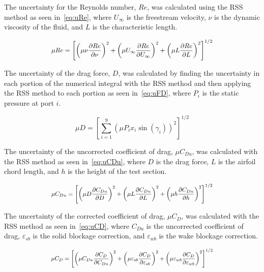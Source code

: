 \documentclass[journal,letterpaper]{IEEEtran}
\begin{document}
The uncertainty for the Reynolds number, $Re$, was calculated using the RSS method as seen in~\eqref{eq:uRe}, where $U_\infty$ is the freestream velocity, $\nu$ is the dynamic viscosity of the fluid, and $L$ is the characteristic length.

\begin{equation} \label{eq:uRe}
    \resizebox{227pt}{!}{$\displaystyle{\mu Re = \left[\left(\mu \nu \frac{\partial Re}{\partial \nu}\right)^2 + \left(\mu U_\infty \frac{\partial Re}{\partial U_\infty}\right)^2 + \left(\mu L \frac{\partial Re}{\partial L}\right)^2\right]^{1/2}}$}
\end{equation}

The uncertainty of the drag force, $D$, was calculated by finding the uncertainty in each portion of the numerical integral with the RSS method and then applying the RSS method to each portion as seen in~\eqref{eq:uFD}, where $P_i$ is the static pressure at port $i$.

\begin{equation} \label{eq:uFD}
    \mu D = \left[\sum_{i=1}^9 \left(\mu P_i x_i \sin\left(\gamma_i\right)\right)^2\right]^{1/2}
\end{equation}

The uncertainty of the uncorrected coefficient of drag, $\mu C_{Du}$, was calculated with the RSS method as seen in~\eqref{eq:uCDu}, where $D$ is the drag force, $L$ is the airfoil chord length, and $h$ is the height of the test section.

\begin{equation} \label{eq:uCDu}
    \resizebox{227pt}{!}{$\displaystyle{\mu C_{Du} = \left[\left(\mu D \frac{\partial C_{Du}}{\partial D}\right)^2 + \left(\mu L \frac{\partial C_{Du}}{\partial L}\right)^2 + \left(\mu h \frac{\partial C_{Du}}{\partial h}\right)^2\right]^{1/2}}$}
\end{equation}

The uncertainty of the corrected coefficient of drag, $\mu C_D$, was calculated with the RSS method as seen in~\eqref{eq:uCD}, where $C_{Du}$ is the uncorrected coefficient of drag, $\varepsilon_{sb}$ is the solid blockage correction, and $\varepsilon_{wb}$ is the wake blockage correction.

\begin{equation} \label{eq:uCD}
    \resizebox{227pt}{!}{$\displaystyle{\mu C_{D} = \left[\left(\mu C_{Du} \frac{\partial C_{D}}{\partial C_{Du}}\right)^2 + \left(\mu \varepsilon_{sb} \frac{\partial C_{D}}{\partial \varepsilon_{sb}}\right)^2 + \left(\mu \varepsilon_{wb} \frac{\partial C_{D}}{\partial \varepsilon_{wb}}\right)^2\right]^{1/2}}$}
\end{equation}
\end{document}
